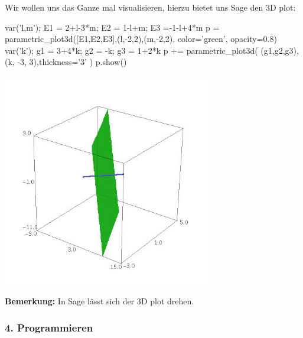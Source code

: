 \documentclass[fontsize=12pt,paper=a4,twoside,bibtotoc,idxtotoc,
liststotoc,pagesize,BCOR1.2cm,DIV15,chapterprefix,pagesize=pdftex]{scrbook}
\begin{document}
Wir wollen uns das Ganze mal visualisieren, hierzu bietet uns Sage den 3D plot:
\begin{sagein}
var('l,m'); E1 = 2+l-3*m; E2 = 1-l+m; E3 =-1-l+4*m
p = parametric_plot3d([E1,E2,E3],(l,-2,2),(m,-2,2), color='green', opacity=0.8)
var('k'); g1 = 3+4*k; g2 = -k; g3 = 1+2*k
p += parametric_plot3d( (g1,g2,g3), (k, -3, 3),thickness='3' ) 
p.show()
\end{sagein}
\begin{center}
\includegraphics[width=0.7\textwidth]{ebene2}
\end{center}
\textbf{Bemerkung:} In Sage lässt sich der 3D plot drehen.
\newpage

\subsubsection{4. Programmieren}
\end{document}

